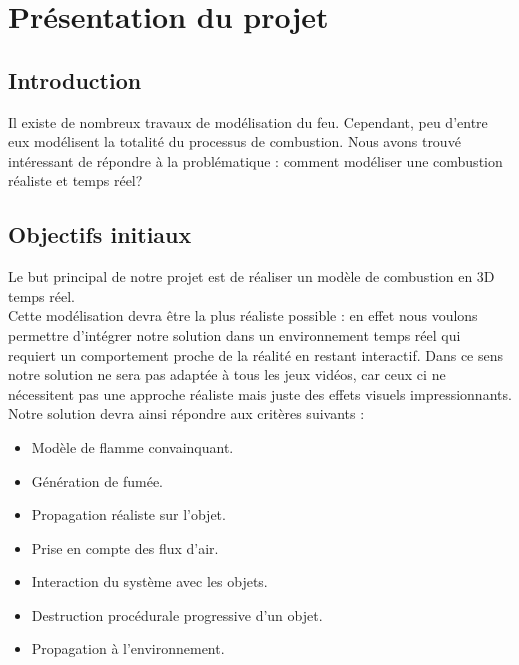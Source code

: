 \documentclass[a4paper,10pt]{article}
\begin{document}
\newpage

\tableofcontents

\newpage



\section{Présentation du projet}
\subsection{Introduction}
Il existe de nombreux travaux de modélisation du feu. Cependant, peu d'entre eux
modélisent la totalité du processus de combustion. Nous avons trouvé intéressant
de répondre à la problématique : comment modéliser une combustion réaliste et temps réel?


\subsection{Objectifs initiaux}
Le but principal de notre projet est de réaliser un modèle de combustion en 3D temps
réel. \\
Cette modélisation devra être la plus réaliste possible : en
effet nous voulons permettre d'intégrer notre solution dans un
environnement temps réel qui requiert un comportement proche de la
réalité en restant interactif.
Dans ce sens notre solution ne sera pas adaptée à tous les jeux vidéos, car ceux ci ne nécessitent pas une
approche réaliste mais juste des effets visuels impressionnants.\\

Notre solution devra ainsi répondre aux critères suivants :
\begin{itemize}
\item Modèle de flamme convainquant. 
\item Génération de fumée.
\item Propagation réaliste sur l'objet. 
\item Prise en compte des flux d'air.
\item Interaction du système avec les objets.
\item Destruction procédurale progressive d'un objet.
\item Propagation à l'environnement.
\end{itemize}
\end{document}
